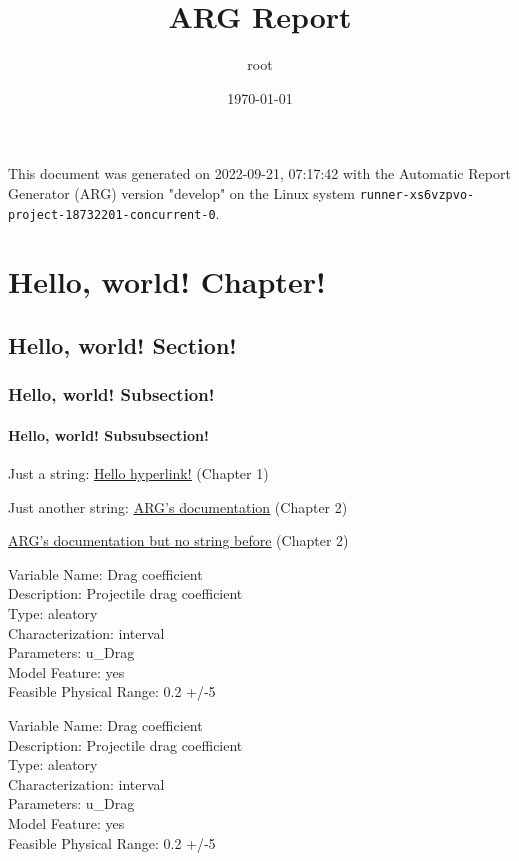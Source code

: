 \documentclass[letter,titlepage,oneside,11pt]{report}%
\title{\textbf{ARG Report}}%
\author{root}%
\date{\today}%
\begin{document}
%
\normalsize%
\maketitle%
\cleardoublepage%
This document was generated on 2022-09-21, 07:17:42 with the Automatic Report Generator (ARG) version "develop" on the Linux system \texttt{runner-xs6vzpvo-project-18732201-concurrent-0}.%
\cleardoublepage%
\tableofcontents%
\listoffigures%
\listoftables%
\cleardoublepage%
\chapter{Hello, world! Chapter!}%
\par%
\section{Hello, world! Section!}%
\par%
\subsection{Hello, world! Subsection!}%
\par%
\subsubsection{Hello, world! Subsubsection!}%
\par%
\par%
Just a string: %
\href{expected/build_tests-hello_world-Report-LaTeX.pdf}{\underline{Hello hyperlink!}}%
 (Chapter 1)%
\\%
\par%
Just another string: %
\href{https://automaticreportgenerator.gitlab.io/arg/}{\underline{ARG's documentation}}%
 (Chapter 2)%
\\%
\par%
\href{https://automaticreportgenerator.gitlab.io/arg/}{\underline{ARG's documentation but no string before}}%
 (Chapter 2)%
\\%
\par%
Variable Name: Drag coefficient\\Description: Projectile drag coefficient\\Type: aleatory\\Characterization: interval\\Parameters: u_Drag\\Model Feature: yes\\Feasible Physical Range: 0.2 +/-5%
\par%
Variable Name: Drag coefficient\\Description: Projectile drag coefficient\\Type: aleatory\\Characterization: interval\\Parameters: u_Drag\\Model Feature: yes\\Feasible Physical Range: 0.2 +/-5%
\end{document}
